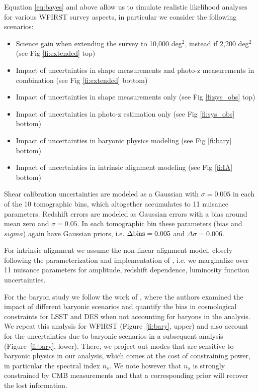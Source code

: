 Equation \ref{eq:bayes} and above allow us to simulate realistic likelihood analyses for various WFIRST survey aspects, in particular we consider the following scenarios:
\begin{itemize}
\item Science gain when extending the survey to 10,000 deg$^2$, instead if 2,200 deg$^2$ (see Fig \ref{fi:extended} top)
\item Impact of uncertainties in shape measurements and photo-z measurements in combination (see Fig \ref{fi:extended} bottom)
\item Impact of uncertainties in shape measurements only (see Fig \ref{fi:sys_obs} top)
\item Impact of uncertainties in photo-z estimation only (see Fig \ref{fi:sys_obs} bottom)
\item Impact of uncertainties in baryonic physics modeling (see Fig \ref{fi:bary} bottom)
\item Impact of uncertainties in intrinsic alignment modeling (see Fig \ref{fi:IA} bottom)
\end{itemize}

Shear calibration uncertainties are modeled as a Gaussian with $\sigma=0.005$ in each of the 10 tomographic bins, which altogether accumulates to 11 nuisance parameters. Redshift errors are modeled as Gaussian errors with a bias around mean zero and $\sigma=0.05$. In each tomographic bin these parameters (bias and $sigma$) again have Gaussian priors, i.e. $\Delta \mathrm{bias}=0.005$ and $\Delta \sigma=0.006$.

For intrinsic alignment we assume the non-linear alignment model, closely following the parameterization and implementation of \cite{Krause2016}, i.e. we marginalize over 11 nuisance parameters for amplitude, redshift dependence, luminosity function uncertainties.

For the baryon study we follow the work of \cite{Eifler15}, where the authors
examined the impact of different baryonic scenarios and quantify the bias in
cosmological constraints for LSST and DES when not accounting for baryons in the
analysis. We repeat this analysis for WFIRST (Figure~\ref{fi:bary}, upper) and
also account for the uncertainties due to baryonic scenarios in a subsequent
analysis (Figure~\ref{fi:bary}, lower). There, we project out modes that are
sensitive to baryonic physics in our analysis, which comes at the cost of
constraining power, in particular the spectral index $n_s$. We note however that
$n_s$ is strongly constrained by CMB measurements and that a corresponding prior
will recover the lost information.


